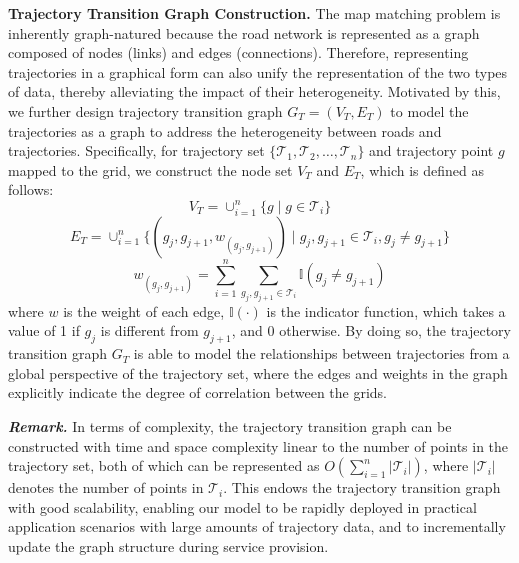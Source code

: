 \noindent \textbf{Trajectory Transition Graph Construction.} The map matching problem is inherently graph-natured because the road network is represented as a graph composed of nodes (links) and edges (connections). Therefore, representing trajectories in a graphical form can also unify the representation of the two types of data, thereby alleviating the impact of their heterogeneity. Motivated by this, we further design trajectory transition graph $G_T = (V_T, E_T)$ to model the trajectories as a graph to address the heterogeneity between roads and trajectories.  Specifically, for trajectory set $\{\mathcal{T}_1, \mathcal{T}_2, \ldots, \mathcal{T}_n\}$ and trajectory point $g$ mapped to the grid, we construct the node set $V_T$ and $E_T$, which is defined as follows:
\begin{equation}
    V_T = \cup_{i=1}^{n} \{ g \mid g \in \mathcal{T}_i \}
\end{equation}
\begin{equation}
    E_T = \cup_{i=1}^{n} \{(g_j, g_{j+1}, w_{(g_j, g_{j+1})}) \mid g_j, g_{j+1} \in \mathcal{T}_i, g_j \neq g_{j+1} \}
\end{equation}
\begin{equation}
    w_{(g_j, g_{j+1})} = \sum_{i=1}^{n} \sum_{g_j, g_{j+1} \in \mathcal{T}_i} \mathbb{I}(g_j \neq g_{j+1})
\end{equation}
where $w$ is the weight of each edge, $\mathbb{I}(\cdot)$ is the indicator function, which takes a value of 1 if $g_j$ is different from $g_{j+1}$, and 0 otherwise. By doing so, the trajectory transition graph $G_T$ is able to model the relationships between trajectories from a global perspective of the trajectory set, where the edges and weights in the graph explicitly indicate the degree of correlation between the grids.

\noindent \textit{\textbf{Remark.}} In terms of complexity, the trajectory transition graph can be constructed with time and space complexity linear to the number of points in the trajectory set, both of which can be represented as $O(\sum_{i=1}^{n}|\mathcal{T}_i|)$, where $|\mathcal{T}_i|$ denotes the number of points in $\mathcal{T}_i$. This endows the trajectory transition graph with good scalability, enabling our model to be rapidly deployed in practical application scenarios with large amounts of trajectory data, and to incrementally update the graph structure during service provision.

